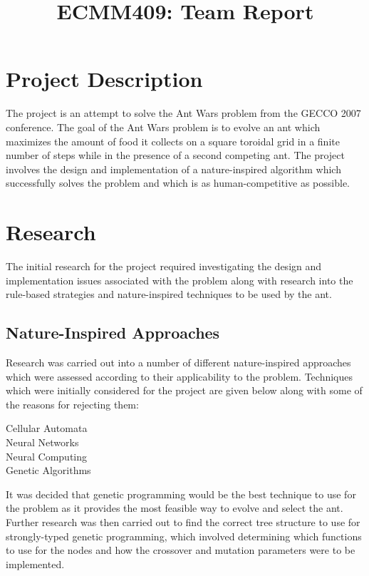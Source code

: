 \documentclass[a4paper, 11pt]{article}
\title{ECMM409: Team Report}
\begin{document}
\maketitle

\section{Project Description}

The project is an attempt to solve the Ant Wars problem from the GECCO
2007 conference. The goal of the Ant Wars problem is to evolve an ant
which maximizes the amount of food it collects on a square toroidal
grid in a finite number of steps while in the presence of a second
competing ant. The project involves the design and implementation of a
nature-inspired algorithm which successfully solves the problem and
which is as human-competitive as possible.

\section{Research}

The initial research for the project required investigating the design
and implementation issues associated with the problem along with
research into the rule-based strategies and nature-inspired techniques
to be used by the ant.

\subsection{Nature-Inspired Approaches}

Research was carried out into a number of different nature-inspired
approaches which were assessed according to their applicability to the
problem. Techniques which were initially considered for the project
are given below along with some of the reasons for rejecting them:
\begin{description}
\item[Cellular Automata]
\item[Neural Networks]
\item[Neural Computing]
\item[Genetic Algorithms]
\end{description}
It was decided that genetic programming would be the best technique to
use for the problem as it provides the most feasible way to evolve and
select the ant. Further research was then carried out to find the
correct tree structure to use for strongly-typed genetic programming,
which involved determining which functions to use for the nodes and
how the crossover and mutation parameters were to be implemented.
\end{document}
